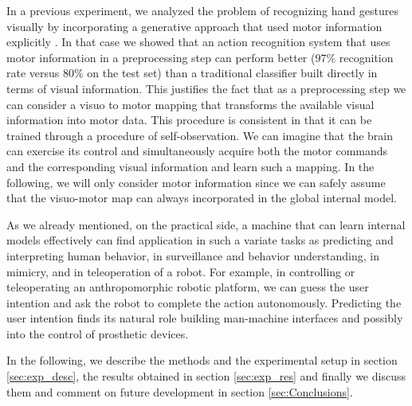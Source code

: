 In a previous experiment, we analyzed the problem of recognizing hand
gestures visually by incorporating a generative approach that used
motor information explicitly \cite{lopes-05,metta-06}. In that case we
showed that an action recognition system that uses motor information
in a preprocessing step can perform better ($97\%$ recognition rate
versus $80\%$ on the test set) than a traditional classifier built
directly in terms of visual information. This justifies the fact that
as a preprocessing step we can consider a visuo to motor mapping that
transforms the available visual information into motor data. This
procedure is consistent in that it can be trained through a procedure
of self-observation. We can imagine that the brain can exercise its
control and simultaneously acquire both the motor commands and the
corresponding visual information and learn such a mapping. In the
following, we will only consider motor information since we can safely
assume that the visuo-motor map can always incorporated in the global
internal model.

As we already mentioned, on the practical side, a machine that can
learn internal models effectively can find application in such a
variate tasks as predicting and interpreting human behavior, in
surveillance and behavior understanding, in mimicry, and in
teleoperation of a robot. For example, in controlling or teleoperating
an anthropomorphic robotic platform, we can guess the user intention
and ask the robot to complete the action autonomously. Predicting the
user intention finds its natural role building man-machine interfaces
and possibly into the control of prosthetic devices.

In the following, we describe the methods and the experimental setup
in section \ref{sec:exp_desc}, the results obtained in section
\ref{sec:exp_res} and finally we discuss them and comment on future
development in section \ref{sec:Conclusions}.
